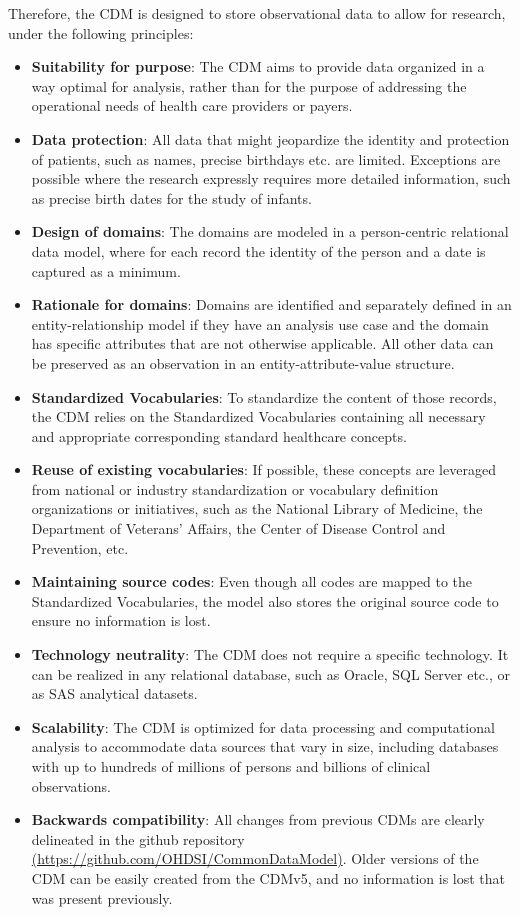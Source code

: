 \documentclass[11pt]{book}
\providecommand{\tightlist}{%
  \setlength{\itemsep}{0pt}\setlength{\parskip}{0pt}}
\begin{document}
Therefore, the CDM is designed to store observational data to allow for
research, under the following principles:

\begin{itemize}
\tightlist
\item
  \textbf{Suitability for purpose}: The CDM aims to provide data
  organized in a way optimal for analysis, rather than for the purpose
  of addressing the operational needs of health care providers or
  payers.
\item
  \textbf{Data protection}: All data that might jeopardize the identity
  and protection of patients, such as names, precise birthdays etc. are
  limited. Exceptions are possible where the research expressly requires
  more detailed information, such as precise birth dates for the study
  of infants.
\item
  \textbf{Design of domains}: The domains are modeled in a
  person-centric relational data model, where for each record the
  identity of the person and a date is captured as a minimum.
\item
  \textbf{Rationale for domains}: Domains are identified and separately
  defined in an entity-relationship model if they have an analysis use
  case and the domain has specific attributes that are not otherwise
  applicable. All other data can be preserved as an observation in an
  entity-attribute-value structure.
\item
  \textbf{Standardized Vocabularies}: To standardize the content of
  those records, the CDM relies on the Standardized Vocabularies
  containing all necessary and appropriate corresponding standard
  healthcare concepts.
\item
  \textbf{Reuse of existing vocabularies}: If possible, these concepts
  are leveraged from national or industry standardization or vocabulary
  definition organizations or initiatives, such as the National Library
  of Medicine, the Department of Veterans' Affairs, the Center of
  Disease Control and Prevention, etc.
\item
  \textbf{Maintaining source codes}: Even though all codes are mapped to
  the Standardized Vocabularies, the model also stores the original
  source code to ensure no information is lost.
\item
  \textbf{Technology neutrality}: The CDM does not require a specific
  technology. It can be realized in any relational database, such as
  Oracle, SQL Server etc., or as SAS analytical datasets.
\item
  \textbf{Scalability}: The CDM is optimized for data processing and
  computational analysis to accommodate data sources that vary in size,
  including databases with up to hundreds of millions of persons and
  billions of clinical observations.
\item
  \textbf{Backwards compatibility}: All changes from previous CDMs are
  clearly delineated in the github repository
  \href{https://github.com/OHDSI/CommonDataModel}{(https://github.com/OHDSI/CommonDataModel)}.
  Older versions of the CDM can be easily created from the CDMv5, and no
  information is lost that was present previously.
\end{itemize}
\end{document}
